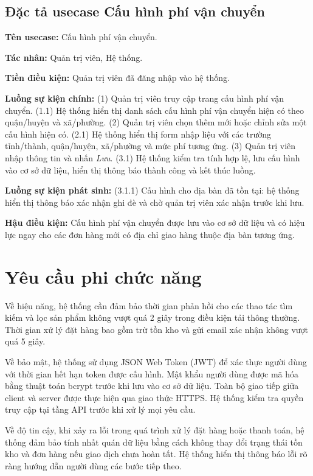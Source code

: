 \documentclass[../DoAn.tex]{subfiles}
\begin{document}
  \subsection{Đặc tả usecase Cấu hình phí vận chuyển}
  \label{subsection:2.3.5}
  \hfill

  \textbf{Tên usecase:} Cấu hình phí vận chuyển.

  \textbf{Tác nhân:} Quản trị viên, Hệ thống.

  \textbf{Tiền điều kiện:} Quản trị viên đã đăng nhập vào hệ thống.

  \textbf{Luồng sự kiện chính:}
  (1) Quản trị viên truy cập trang cấu hình phí vận chuyển.
  (1.1) Hệ thống hiển thị danh sách cấu hình phí vận chuyển hiện có theo quận/huyện
  và xã/phường.
  (2) Quản trị viên chọn thêm mới hoặc chỉnh sửa một cấu hình hiện có.
  (2.1) Hệ thống hiển thị form nhập liệu với các trường tỉnh/thành, quận/huyện,
  xã/phường và mức phí tương ứng.
  (3) Quản trị viên nhập thông tin và nhấn \textit{Lưu}.
  (3.1) Hệ thống kiểm tra tính hợp lệ, lưu cấu hình vào cơ sở dữ liệu, hiển thị
  thông báo thành công và kết thúc luồng.

  \textbf{Luồng sự kiện phát sinh:}
  (3.1.1) Cấu hình cho địa bàn đã tồn tại: hệ thống hiển thị thông báo xác nhận
  ghi đè và chờ quản trị viên xác nhận trước khi lưu.

  \textbf{Hậu điều kiện:} Cấu hình phí vận chuyển được lưu vào cơ sở dữ liệu và
  có hiệu lực ngay cho các đơn hàng mới có địa chỉ giao hàng thuộc địa bàn tương ứng.

  \section{Yêu cầu phi chức năng}
  \label{section:2.4}

  Về hiệu năng, hệ thống cần đảm bảo thời gian phản hồi cho các thao tác tìm kiếm
  và lọc sản phẩm không vượt quá 2 giây trong điều kiện tải thông thường. Thời gian
  xử lý đặt hàng bao gồm trừ tồn kho và gửi email xác nhận không vượt quá 5 giây.

  Về bảo mật, hệ thống sử dụng JSON Web Token (JWT) để xác thực người dùng với
  thời gian hết hạn token được cấu hình. Mật khẩu người dùng được mã hóa bằng thuật
  toán bcrypt trước khi lưu vào cơ sở dữ liệu. Toàn bộ giao tiếp giữa client và
  server được thực hiện qua giao thức HTTPS. Hệ thống kiểm tra quyền truy cập tại
  tầng API trước khi xử lý mọi yêu cầu.

  Về độ tin cậy, khi xảy ra lỗi trong quá trình xử lý đặt hàng hoặc thanh toán,
  hệ thống đảm bảo tính nhất quán dữ liệu bằng cách không thay đổi trạng thái tồn
  kho và đơn hàng nếu giao dịch chưa hoàn tất. Hệ thống hiển thị thông báo lỗi rõ
  ràng hướng dẫn người dùng các bước tiếp theo.
\end{document}
